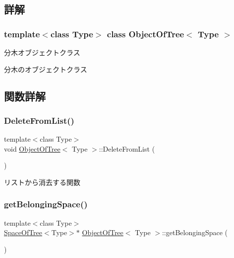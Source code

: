 \subsection{詳解}
\subsubsection*{template$<$class Type$>$\newline
class Object\+Of\+Tree$<$ Type $>$}

分木オブジェクトクラス 

分木のオブジェクトクラス 

\subsection{関数詳解}
\mbox{\label{class_object_of_tree_a1356595b29749ca4555ca61a5bb30388}} 
\subsubsection{\texorpdfstring{Delete\+From\+List()}{DeleteFromList()}}
{\footnotesize\ttfamily template$<$class Type$>$ \\
void \mbox{\hyperlink{class_object_of_tree}{Object\+Of\+Tree}}$<$ Type $>$\+::Delete\+From\+List (\begin{DoxyParamCaption}{ }\end{DoxyParamCaption})\hspace{0.3cm}{\ttfamily [inline]}}



リストから消去する関数 

\mbox{\label{class_object_of_tree_a94c5724ddb841da0bb31ab6ae63df304}} 
\subsubsection{\texorpdfstring{get\+Belonging\+Space()}{getBelongingSpace()}}
{\footnotesize\ttfamily template$<$class Type$>$ \\
\mbox{\hyperlink{class_space_of_tree}{Space\+Of\+Tree}}$<$Type$>$$\ast$ \mbox{\hyperlink{class_object_of_tree}{Object\+Of\+Tree}}$<$ Type $>$\+::get\+Belonging\+Space (\begin{DoxyParamCaption}{ }\end{DoxyParamCaption})\hspace{0.3cm}{\ttfamily [inline]}}

